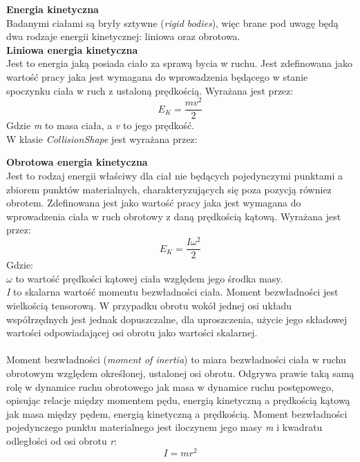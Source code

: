 \textbf{Energia kinetyczna}\\
Badanymi ciałami są bryły sztywne (\emph{rigid bodies}), więc brane
pod uwagę będą dwa rodzaje energii kinetycznej: liniowa oraz obrotowa.\\

\textbf{Liniowa energia kinetyczna}\\
Jest to energia jaką posiada ciało za sprawą bycia w ruchu. Jest zdefinowana
jako wartość pracy jaka jest wymagana do wprowadzenia będącego w stanie
spoczynku ciała w ruch z ustaloną prędkością. Wyrażana jest przez:
\begin{equation}
E_{K} = \frac{mv^{2}}{2}
\end{equation}
Gdzie \emph{m} to masa ciała, a \emph{v} to jego prędkość.\\
W klasie \emph{CollisionShape} jest wyrażana przez:




\textbf{Obrotowa energia kinetyczna}\\
Jest to rodzaj energii właściwy dla ciał nie będących pojedynczymi punktami a
zbiorem punktów materialnych, charakteryzujących się poza pozycją równiez
obrotem. Zdefinowana jest jako wartość pracy jaka jest wymagana do wprowadzenia
ciała w ruch obrotowy z daną prędkością kątową. Wyrażana jest przez:
\begin{equation}
E_{K} = \frac{I\omega^{2}}{2}
\end{equation}
Gdzie:\\
$ \omega $ to wartość prędkości kątowej ciała względem jego środka masy.\\
\emph{I} to skalarna wartość momentu bezwładności ciała. Moment bezwładności
jest wielkością tensorową. W przypadku obrotu wokół jednej osi układu
współrzędnych jest jednak dopuszczalne, dla uproszczenia, użycie jego
składowej wartości odpowiadającej osi obrotu jako wartości skalarnej.\\
\\
Moment bezwładności (\emph{moment of inertia}) to miara bezwładności ciała
w ruchu obrotowym względem określonej, ustalonej osi obrotu. Odgrywa prawie taką samą
rolę w dynamice ruchu obrotowego jak masa w dynamice ruchu postępowego, opisując
relacje między momentem pędu, energią kinetyczną a prędkością kątową jak masa
między pędem, energią kinetyczną a prędkością. Moment bezwładności pojedynczego
punktu materialnego jest iloczynem jego masy \emph{m} i kwadratu odległości od
osi obrotu \emph{r}:
\begin{equation}
I = mr^{2}
\end{equation}

